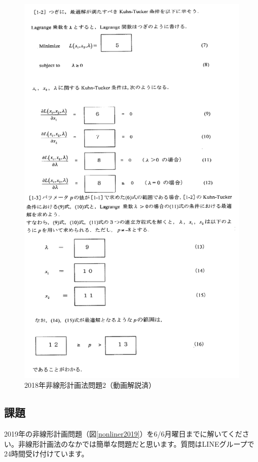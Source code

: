 \documentclass{jsarticle}
\begin{document}
\begin{figure}[htbp]
  \includegraphics[keepaspectratio, width=14cm]{figures/nonliner20182.png}
  \caption{2018年非線形計画法問題2（動画解説済）\label{nonliner20182}}
\end{figure}


\subsection{課題}
2019年の非線形計画問題（図\ref{nonliner2019}）を6/6月曜日までに解いてください。非線形計画法のなかでは簡単な問題だと思います。質問はLINEグループで24時間受け付けています。
\end{document}
